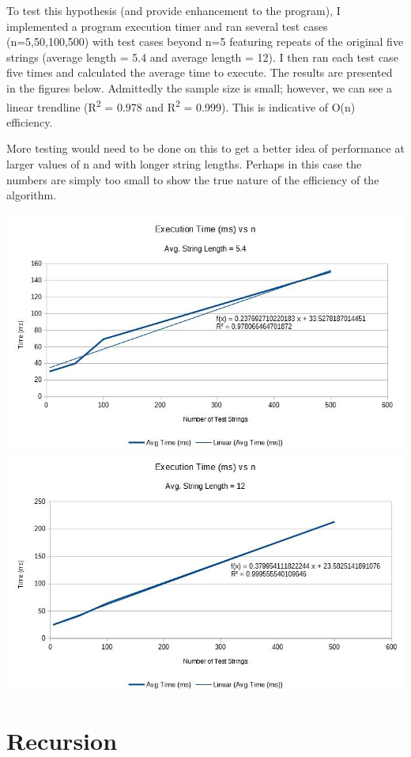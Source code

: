 \documentclass[12pt, titlepage]{article}
\begin{document}
To test this hypothesis (and provide enhancement to the program), I implemented a program execution timer and ran several test cases (n=5,50,100,500) with test cases beyond n=5 featuring repeats of the original five strings (average length = 5.4 and average length = 12). I then ran each test case five times and calculated the average time to execute. The results are presented in the figures below. Admittedly the sample size is small; however, we can see a linear trendline (R\textsuperscript{2} = 0.978 and R\textsuperscript{2} = 0.999). This is indicative of O(n) efficiency.

More testing would need to be done on this to get a better idea of performance at larger values of n and with longer string lengths. Perhaps in this case the numbers are simply too small to show the true nature of the efficiency of the algorithm. 

\includegraphics[width=\textwidth]{Efficiency}
\includegraphics[width=\textwidth]{Efficiency2}

\section{Recursion}
\end{document}
